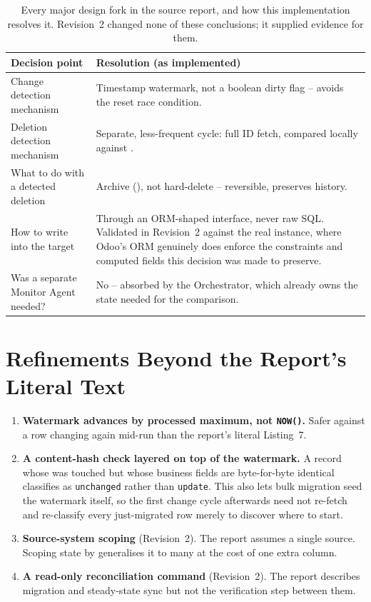 \documentclass[11pt,a4paper]{article}
\newcommand{\ttu}[1]{\texttt{\detokenize{#1}}}
\begin{document}
\begin{table}[H]
\centering
\small
\begin{tabular}{@{}p{4.6cm}p{9.4cm}@{}}
\toprule
\textbf{Decision point} & \textbf{Resolution (as implemented)} \\
\midrule
Change detection mechanism & Timestamp watermark, not a boolean dirty flag -- avoids the
reset race condition. \\
Deletion detection mechanism & Separate, less-frequent cycle: full ID fetch, compared locally
against \ttu{sync_mapping}. \\
What to do with a detected deletion & Archive (\ttu{active=False}), not hard-delete --
reversible, preserves history. \\
How to write into the target & Through an ORM-shaped interface, never raw SQL. Validated in
Revision~2 against the real instance, where Odoo's ORM genuinely does enforce the constraints
and computed fields this decision was made to preserve. \\
Was a separate Monitor Agent needed? & No -- absorbed by the Orchestrator, which already owns the
state needed for the comparison. \\
\bottomrule
\end{tabular}
\caption{Every major design fork in the source report, and how this implementation resolves it.
Revision~2 changed none of these conclusions; it supplied evidence for them.}
\end{table}

\section{Refinements Beyond the Report's Literal Text}
\label{sec:refinements}

\begin{enumerate}[leftmargin=1.4em]
    \item \textbf{Watermark advances by processed maximum, not \texttt{NOW()}.} Safer against a
          row changing again mid-run than the report's literal Listing~7.
    \item \textbf{A content-hash check layered on top of the watermark.} A record whose
          \ttu{last_updated} was touched but whose business fields are byte-for-byte identical
          classifies as \texttt{unchanged} rather than \texttt{update}. This also lets bulk
          migration seed the watermark itself, so the first change cycle afterwards need not
          re-fetch and re-classify every just-migrated row merely to discover where to start.
    \item \textbf{Source-system scoping} (Revision~2). The report assumes a single source. Scoping
          state by \ttu{source_system} generalises it to many at the cost of one extra column.
    \item \textbf{A read-only reconciliation command} (Revision~2). The report describes migration
          and steady-state sync but not the verification step between them.
\end{enumerate}
\end{document}
